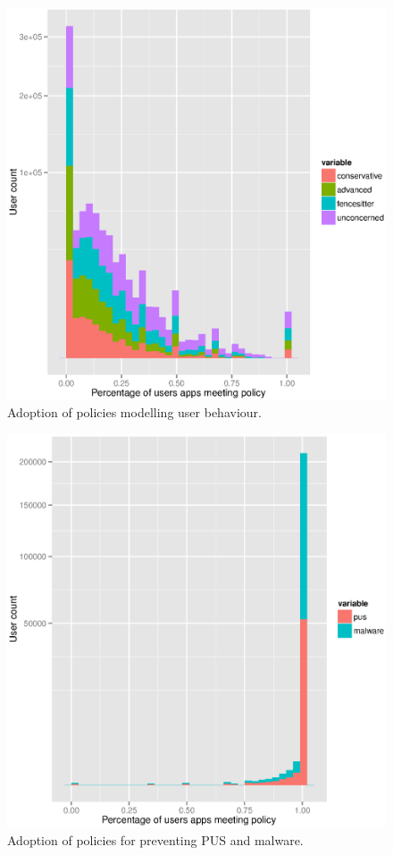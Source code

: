 \documentclass[twocolumn,letterpaper]{soups-poster}
\begin{document}
\begin{figure}[!h]
  \includegraphics[width=\linewidth]{./tables/lin.eps}
  \caption{Adoption of policies modelling user behaviour.}
  \label{fig:lin}
\end{figure}

\begin{figure}[!h]
  \includegraphics[width=\linewidth]{./tables/malware.eps}
  \caption{Adoption of policies for preventing PUS and malware.}
  \label{fig:malware}
\end{figure}
\end{document}
